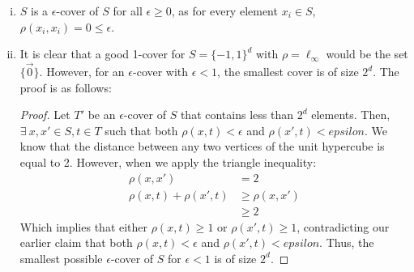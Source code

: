 \begin{enumerate}[(i)]
	\item $S$ is a $\epsilon$-cover of $S$ for all $\epsilon \geq 0$,
	as for every element $x_i \in S$, $\rho(x_i, x_i) = 0 \leq 
	\epsilon$.
	
	\item It is clear that a good 1-cover for $S = \{-1, 1\}^d$ with 
	$\rho = \ell_\infty$ would be the set $\{\vec{0}\}$. However, for 
	an $\epsilon$-cover with $\epsilon < 1$, the smallest cover is of 
	size $2^d$. The proof is as follows:
	
	\begin{proof}
		Let $T'$ be an $\epsilon$-cover of $S$ that contains less than
		$2^d$ elements. Then, $\exists\ x, x' \in S, t \in T$ such that 
		both $\rho(x, t) < \epsilon$ and $\rho(x', t) < epsilon$. We 
		know that the distance between any two vertices of the unit 
		hypercube is equal to 2. However, when we apply the triangle
		inequality:
		\begin{align*}
			\rho(x, x') & = 2\\
			\rho(x, t) + \rho(x', t) & \geq \rho(x, x')\\
			& \geq 2
		\end{align*}
		Which implies that either $\rho(x, t) \geq 1$ or $\rho(x', t) 
		\geq 1$, contradicting our earlier claim that both $\rho(x, t) 
		< \epsilon$ and $\rho(x', t) < epsilon$. Thus, the smallest
		possible $\epsilon$-cover of $S$ for $\epsilon < 1$ is of size
		$2^d$.
	\end{proof}
\end{enumerate}

